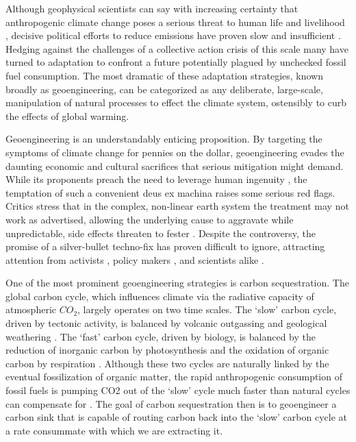 Although geophysical scientists can say with increasing certainty that anthropogenic climate change poses a serious threat to human life and livelihood \parencite{ClimateChange20142014}, decisive political efforts to reduce emissions have proven slow and insufficient \parencite{ClarkHasKyotoprotocol2012,HoviImplementingLongTermClimate2009, ShearTrumpWillWithdraw2018}. Hedging against the challenges of a collective action crisis of this scale \parencite{ThompsonManagementAnarchyInternational2006} many have turned to adaptation to confront a future potentially plagued by unchecked fossil fuel consumption. The most dramatic of these adaptation strategies, known broadly as geoengineering, can be categorized as any deliberate, large-scale, manipulation of natural processes to effect the climate system, ostensibly to curb the effects of global warming. 

Geoengineering is an understandably enticing proposition. By targeting the symptoms of climate change for pennies on the dollar, geoengineering evades the daunting economic and cultural sacrifices that serious mitigation might demand. While its proponents preach the need to leverage human ingenuity \parencite{LynasGodSpeciesSaving2011}, the temptation of such a convenient deus ex machina raises some serious red flags. Critics stress that in the complex, non-linear earth system the treatment may not work as advertised, allowing the underlying cause to aggravate while unpredictable, side effects threaten to fester \parencite{LynasGodSpeciesSaving2011,Robock20reasonswhy2008}. Despite the controversy, the promise of a silver-bullet techno-fix has proven difficult to ignore, attracting attention from activists \parencite{KeithCaseClimateEngineering2013}, policy makers \parencite{FullCommitteeHearing2009,ReichleWORKINGPAPERCARBON1999}, and scientists alike \parencite{YoonOceanIronFertilization2016}. 

One of the most prominent geoengineering strategies is carbon sequestration. The global carbon cycle, which influences climate via the radiative capacity of atmospheric $CO_2$, largely operates on two time scales. The ‘slow’ carbon cycle, driven by tectonic activity, is balanced by volcanic outgassing and geological weathering \parencite{BernerAtmosphericcarbondioxide1990}. The ‘fast’ carbon cycle, driven by biology, is balanced by the reduction of inorganic carbon by photosynthesis and the oxidation of organic carbon by respiration \parencite{RiebeekCarbonCycleFeature2011}. Although these two cycles are naturally linked by the eventual fossilization of organic matter, the rapid anthropogenic consumption of fossil fuels is pumping CO2 out of the ‘slow’ cycle much faster than natural cycles can compensate for \parencite{ChisholmDisCreditingOceanFertilization2001}. The goal of carbon sequestration then is to geoengineer a carbon sink that is capable of routing carbon back into the ‘slow’ carbon cycle at a rate consummate with which we are extracting it. 

